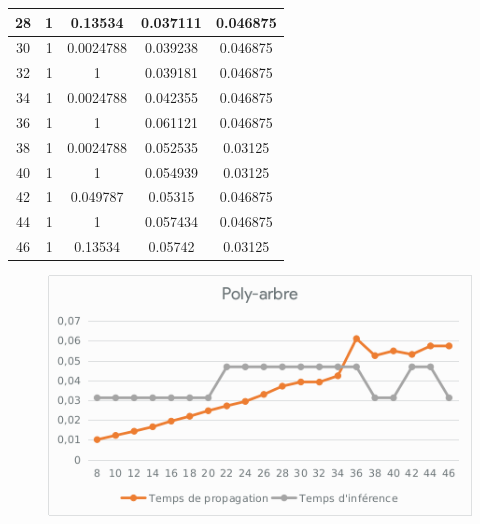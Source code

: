 \documentclass[]{report}
\begin{document}
\begin{table}[H]
{\begin{tabular}{|c|c|c|c|c|}
    28                    & 1                      & 0.13534                       & 0.037111                      & 0.046875                   \\ \hline
    30                    & 1                      & 0.0024788                     & 0.039238                      & 0.046875                   \\ \hline
    32                    & 1                      & 1                             & 0.039181                      & 0.046875                   \\ \hline
    34                    & 1                      & 0.0024788                     & 0.042355                      & 0.046875                   \\ \hline
    36                    & 1                      & 1                             & 0.061121                      & 0.046875                   \\ \hline
    38                    & 1                      & 0.0024788                     & 0.052535                      & 0.03125                    \\ \hline
    40                    & 1                      & 1                             & 0.054939                      & 0.03125                    \\ \hline
    42                    & 1                      & 0.049787                      & 0.05315                       & 0.046875                   \\ \hline
    44                    & 1                      & 1                             & 0.057434                      & 0.046875                   \\ \hline
    46                    & 1                      & 0.13534                       & 0.05742                       & 0.03125                    \\ \hline
    \end{tabular}%
    }
	\end{table}
	
	\begin{figure}[H]
		\centering
		\includegraphics[width=0.75\linewidth]{sheets/poly.png}
	\end{figure}
\end{document}
